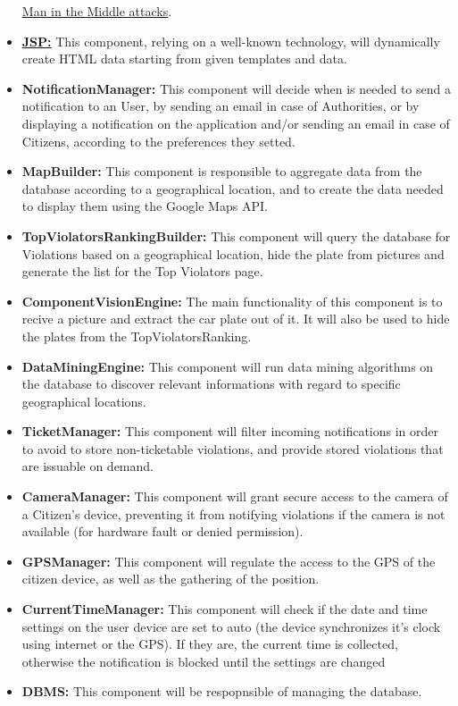 \documentclass{article}
\newcommand{\link}[2]{{\color{blue}\underline{\href{#1}{#2}}}}
\begin{document}
\begin{itemize}
		 	\link{https://en.wikipedia.org/wiki/Man-in-the-middle_attack}{Man in the Middle attacks}.
		 \item \label{component:JSP} \textbf{\link{https://en.wikipedia.org/wiki/JavaServer_Pages}{JSP:}}
		 	This component, relying on a well-known technology, will dynamically create HTML data starting from given templates and data.
		 \item \label{component:NotificationManager} \textbf{NotificationManager:}
		 	This component will decide when is needed to send a notification to an User, by sending an email in case of Authorities, or by displaying a notification 
		 	on the application and/or sending an email in case of Citizens, according to the preferences they setted.
		 \item \label{component:MapBuilder} \textbf{MapBuilder:}
		 	This component is responsible to aggregate data from the database according to a geographical location, and to create the data needed to display them
		 	using the Google Maps API.
		 \item \label{component:TopViolatorsRankingBuilder} \textbf{TopViolatorsRankingBuilder:}
		 	This component will query the database for Violations based on a geographical location, hide the plate from pictures and
		 	generate the list for the Top Violators page.
		 \item \label{component:ComputerVisionEngine} \textbf{ComponentVisionEngine:}
		 	The main functionality of this component is to recive a picture and extract the car plate out of it.
		 	It will also be used to hide the plates from the TopViolatorsRanking.
		 \item \label{component:DataMiningEngine} \textbf{DataMiningEngine:}
		 	This component will run data mining algorithms on the database to discover relevant informations with regard to specific geographical
		 	locations.
		 \item \label{component:TicketManager} \textbf{TicketManager:}
		 	This component will filter incoming notifications in order to avoid to store non-ticketable violations, and provide stored violations that are
		 	issuable on demand.
		 \item \label{component:CameraManager} \textbf{CameraManager:}
		 	This component will grant secure access to the camera of a Citizen's device, preventing it from notifying violations if the camera is not 
		 	available (for hardware fault or denied permission).
		 \item \label{component:GPSManager} \textbf{GPSManager:}
		 	This component will regulate the access to the GPS of the citizen device, as well as the gathering of the position.
		 \item \label{component:CurrentTimeManager} \textbf{CurrentTimeManager:}
		 	This component will check if the date and time settings on the user device are set to auto (the device synchronizes it's clock using 
		 	internet or the GPS). If they are, the current time is collected, otherwise the notification is blocked until the settings are changed
		 \item \label{component:DBMS} \textbf{DBMS:}
		 	This component will be respopnsible of managing the database.
	\end{itemize}
	\newpage \FloatBarrier
\end{document}
